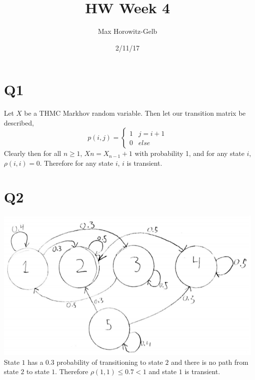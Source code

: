 \documentclass{article}
\title{HW Week 4}
\author{Max Horowitz-Gelb}
\date{2/11/17}
\begin{document}
\maketitle
\section*{Q1}
Let $X$ be a THMC Markhov random variable.
Then let our transition matrix be described,
\[
p(i,j) = 
\begin{cases}
1 & j = i + 1 \\
0 & else
\end{cases}
\]
Clearly then for all $n \geq 1$, $Xn = X_{n-1} + 1$ with probability 1,
and for any state $i$, $\rho(i,i) = 0$. Therefore for any state $i$, $i$ is transient. 

\section*{Q2}
\includegraphics[scale=0.75]{transition.png}
State $1$ has a $0.3$ probability of transitioning to state $2$ and there is no path from state $2$ to state $1$. Therefore $\rho(1,1) \leq 0.7 < 1$ and state $1$ is transient.
\end{document}
